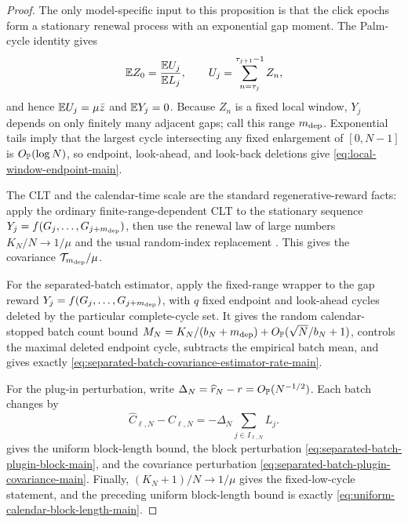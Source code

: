 \begin{proof}
The only model-specific input to this proposition is that the click epochs
form a stationary renewal process with an exponential gap moment.  The
Palm-cycle identity gives
\[
\mathbb E Z_0=\frac{\mathbb E U_j}{\mathbb E L_j},\qquad
U_j=\sum_{n=\tau_j}^{\tau_{j+1}-1}Z_n,
\]
and hence \(\mathbb E U_j=\mu\bar z\) and \(\mathbb E Y_j=0\).  Because \(Z_n\) is a fixed
local window, \(Y_j\) depends on only finitely many adjacent gaps; call this
range \(m_{\rm dep}\).  Exponential tails imply that the largest cycle
intersecting any fixed enlargement of \([0,N-1]\) is \(O_{\mathbb P}(\log N)\), so
endpoint, look-ahead, and look-back deletions give
\eqref{eq:local-window-endpoint-main}.

The CLT and the calendar-time scale are the standard regenerative-reward
facts: apply the ordinary finite-range-dependent CLT to the stationary
sequence \(Y_j=f(G_j,\ldots,G_{j+m_{\rm dep}})\), then use the renewal law of
large numbers \(K_N/N\to1/\mu\) and the usual random-index replacement
\cite[Chs.~IV.3 and VI.3]{AsmussenGlynn2007}.  This gives the covariance
\(\mathcal T_{m_{\rm dep}}/\mu\).

For the separated-batch estimator, apply the fixed-range wrapper
 to the gap reward
\(Y_j=f(G_j,\ldots,G_{j+m_{\rm dep}})\), with \(q\) fixed endpoint and
look-ahead cycles deleted by the particular complete-cycle set.  It gives the
random calendar-stopped batch count bound
\(M_N=K_N/(b_N+m_{\rm dep})+O_{\mathbb P}(\sqrt N/b_N+1)\), controls the maximal
deleted endpoint cycle, subtracts the empirical batch mean, and gives exactly
\eqref{eq:separated-batch-covariance-estimator-rate-main}.

For the plug-in perturbation, write
\(\Delta_N=\widehat r_N-r=O_{\mathbb P}(N^{-1/2})\).  Each batch changes by
\[
\widehat C_{\ell,N}-C_{\ell,N}
=-\Delta_N\sum_{j\in I_{\ell,N}}L_j .
\]
 gives the uniform
block-length bound, the block perturbation
\eqref{eq:separated-batch-plugin-block-main}, and the covariance perturbation
\eqref{eq:separated-batch-plugin-covariance-main}.  Finally,
\((K_N+1)/N\to1/\mu\) gives the fixed-low-cycle statement, and the preceding
uniform block-length bound is exactly \eqref{eq:uniform-calendar-block-length-main}.
\end{proof}


